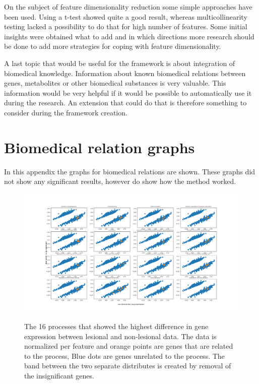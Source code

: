 \documentclass[10pt,a4paper]{article}
\begin{document}
	On the subject of feature dimensionality reduction some simple approaches have been used. Using a t-test showed quite a good result, whereas multicollinearity testing lacked a possibility to do that for high number of features. Some initial insights were obtained what to add and in which directions more research should be done to add more strategies for coping with feature dimensionality.
	
	A last topic that would be useful for the framework is about integration of biomedical knowledge. Information about known biomedical relations between genes, metabolites or other biomedical substances is very valuable. This information would be very helpful if it would be possible to automatically use it during the research. An extension that could do that is therefore something to consider during the framework creation. 
		
	 
	
	
	\newpage
	
	\appendix
	
	\section{Biomedical relation graphs}
	\label{app:BiomedicalClusters}
	
	In this appendix the graphs for biomedical relations are shown. These graphs did not show any significant results, however do show how the method worked.
	
	\begin{figure}[H]
		\includegraphics[width=1\textwidth]{Sign_Processes_Psoriasis_Scaled.png}
		\label{fig:ProcessesScaledByFeature}
		\caption{The 16 processes that showed the highest difference in gene expression between lesional and non-lesional data. The data is normalized per feature and orange points are genes that are related to the process, Blue dots are genes unrelated to the process. The band between the two separate distributes is created by removal of the insignificant genes.}
	\end{figure}
	
\end{document}
